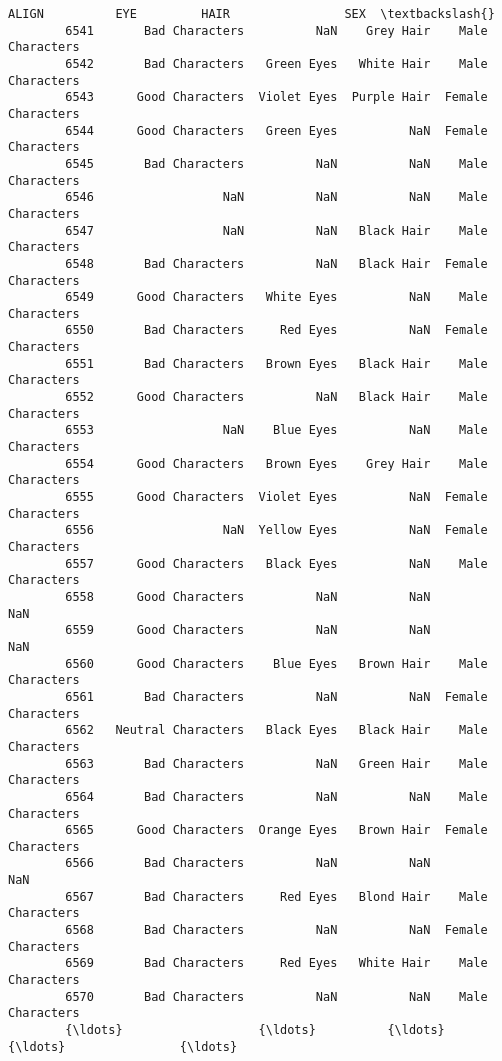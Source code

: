 \documentclass[11pt]{article}
\begin{document}
\begin{Verbatim}[commandchars=\\\{\}]
                            ALIGN          EYE         HAIR                SEX  \textbackslash{}
        6541       Bad Characters          NaN    Grey Hair    Male Characters   
        6542       Bad Characters   Green Eyes   White Hair    Male Characters   
        6543      Good Characters  Violet Eyes  Purple Hair  Female Characters   
        6544      Good Characters   Green Eyes          NaN  Female Characters   
        6545       Bad Characters          NaN          NaN    Male Characters   
        6546                  NaN          NaN          NaN    Male Characters   
        6547                  NaN          NaN   Black Hair    Male Characters   
        6548       Bad Characters          NaN   Black Hair  Female Characters   
        6549      Good Characters   White Eyes          NaN    Male Characters   
        6550       Bad Characters     Red Eyes          NaN  Female Characters   
        6551       Bad Characters   Brown Eyes   Black Hair    Male Characters   
        6552      Good Characters          NaN   Black Hair    Male Characters   
        6553                  NaN    Blue Eyes          NaN    Male Characters   
        6554      Good Characters   Brown Eyes    Grey Hair    Male Characters   
        6555      Good Characters  Violet Eyes          NaN  Female Characters   
        6556                  NaN  Yellow Eyes          NaN  Female Characters   
        6557      Good Characters   Black Eyes          NaN    Male Characters   
        6558      Good Characters          NaN          NaN                NaN   
        6559      Good Characters          NaN          NaN                NaN   
        6560      Good Characters    Blue Eyes   Brown Hair    Male Characters   
        6561       Bad Characters          NaN          NaN  Female Characters   
        6562   Neutral Characters   Black Eyes   Black Hair    Male Characters   
        6563       Bad Characters          NaN   Green Hair    Male Characters   
        6564       Bad Characters          NaN          NaN    Male Characters   
        6565      Good Characters  Orange Eyes   Brown Hair  Female Characters   
        6566       Bad Characters          NaN          NaN                NaN   
        6567       Bad Characters     Red Eyes   Blond Hair    Male Characters   
        6568       Bad Characters          NaN          NaN  Female Characters   
        6569       Bad Characters     Red Eyes   White Hair    Male Characters   
        6570       Bad Characters          NaN          NaN    Male Characters   
        {\ldots}                   {\ldots}          {\ldots}          {\ldots}                {\ldots}   

\end{Verbatim}
\end{document}
